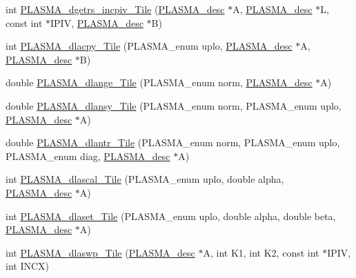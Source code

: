 \begin{DoxyCompactItemize}
\item 
int \hyperlink{group__double__Tile_gae24b0aa20c84d9c1ba57822cc6ffcded_gae24b0aa20c84d9c1ba57822cc6ffcded}{P\+L\+A\+S\+M\+A\+\_\+dgetrs\+\_\+incpiv\+\_\+\+Tile} (\hyperlink{structplasma__desc__t}{P\+L\+A\+S\+M\+A\+\_\+desc} $\ast$A, \hyperlink{structplasma__desc__t}{P\+L\+A\+S\+M\+A\+\_\+desc} $\ast$L, const int $\ast$I\+P\+I\+V, \hyperlink{structplasma__desc__t}{P\+L\+A\+S\+M\+A\+\_\+desc} $\ast$B)
\item 
int \hyperlink{group__double__Tile_gaa9ffb6dcdd121d3df6d7ac53d5f900d8_gaa9ffb6dcdd121d3df6d7ac53d5f900d8}{P\+L\+A\+S\+M\+A\+\_\+dlacpy\+\_\+\+Tile} (P\+L\+A\+S\+M\+A\+\_\+enum uplo, \hyperlink{structplasma__desc__t}{P\+L\+A\+S\+M\+A\+\_\+desc} $\ast$A, \hyperlink{structplasma__desc__t}{P\+L\+A\+S\+M\+A\+\_\+desc} $\ast$B)
\item 
double \hyperlink{group__double__Tile_ga30741b673f53cfa2a361fafda9381311_ga30741b673f53cfa2a361fafda9381311}{P\+L\+A\+S\+M\+A\+\_\+dlange\+\_\+\+Tile} (P\+L\+A\+S\+M\+A\+\_\+enum norm, \hyperlink{structplasma__desc__t}{P\+L\+A\+S\+M\+A\+\_\+desc} $\ast$A)
\item 
double \hyperlink{group__double__Tile_ga2bbcef868db78c41f588e9f05ac6c644_ga2bbcef868db78c41f588e9f05ac6c644}{P\+L\+A\+S\+M\+A\+\_\+dlansy\+\_\+\+Tile} (P\+L\+A\+S\+M\+A\+\_\+enum norm, P\+L\+A\+S\+M\+A\+\_\+enum uplo, \hyperlink{structplasma__desc__t}{P\+L\+A\+S\+M\+A\+\_\+desc} $\ast$A)
\item 
double \hyperlink{group__double__Tile_gadc7484e78e46a16e09432a1e2c404f39_gadc7484e78e46a16e09432a1e2c404f39}{P\+L\+A\+S\+M\+A\+\_\+dlantr\+\_\+\+Tile} (P\+L\+A\+S\+M\+A\+\_\+enum norm, P\+L\+A\+S\+M\+A\+\_\+enum uplo, P\+L\+A\+S\+M\+A\+\_\+enum diag, \hyperlink{structplasma__desc__t}{P\+L\+A\+S\+M\+A\+\_\+desc} $\ast$A)
\item 
int \hyperlink{group__double__Tile_ga31de9c754535316e25719e62a2c3c44b_ga31de9c754535316e25719e62a2c3c44b}{P\+L\+A\+S\+M\+A\+\_\+dlascal\+\_\+\+Tile} (P\+L\+A\+S\+M\+A\+\_\+enum uplo, double alpha, \hyperlink{structplasma__desc__t}{P\+L\+A\+S\+M\+A\+\_\+desc} $\ast$A)
\item 
int \hyperlink{group__double__Tile_ga0cf43a3fed41217e9bbead1b7c4d28e6_ga0cf43a3fed41217e9bbead1b7c4d28e6}{P\+L\+A\+S\+M\+A\+\_\+dlaset\+\_\+\+Tile} (P\+L\+A\+S\+M\+A\+\_\+enum uplo, double alpha, double beta, \hyperlink{structplasma__desc__t}{P\+L\+A\+S\+M\+A\+\_\+desc} $\ast$A)
\item 
int \hyperlink{group__double__Tile_ga545ef170c054566272a2ba6293daad2f_ga545ef170c054566272a2ba6293daad2f}{P\+L\+A\+S\+M\+A\+\_\+dlaswp\+\_\+\+Tile} (\hyperlink{structplasma__desc__t}{P\+L\+A\+S\+M\+A\+\_\+desc} $\ast$A, int K1, int K2, const int $\ast$I\+P\+I\+V, int I\+N\+C\+X)

\end{DoxyCompactItemize}
